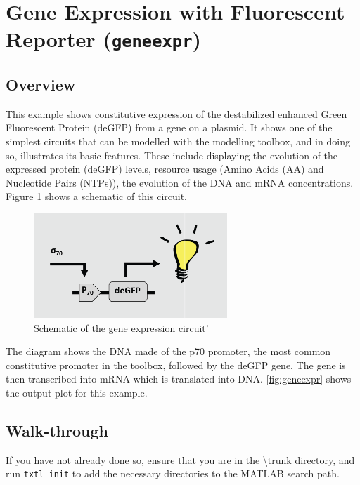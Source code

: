\documentclass[english]{report}
\begin{document}
	\section{Gene Expression with Fluorescent Reporter (\texttt{geneexpr})}
		\subsection{Overview}
		This example shows constitutive expression of the destabilized enhanced Green Fluorescent Protein (deGFP) from a gene on a plasmid. It shows one of the simplest circuits that can be modelled with the modelling toolbox, and in doing so, illustrates its basic features. These include displaying the evolution of the expressed protein (deGFP) levels, resource usage (Amino Acids (AA) and Nucleotide Pairs (NTPs)), the evolution of the DNA and mRNA concentrations. Figure \ref{fig:geneexpr schematic} shows a schematic of this circuit. \\
		
		\begin{figure}
		\begin{center}
		\includegraphics{geneExpr schematic.png} 
		\caption{Schematic of the gene expression circuit'}
		\label{fig:geneexpr schematic}
		\end{center}
		\end{figure}		
		 
		The diagram shows the DNA made of the p70 promoter, the most common constitutive promoter in the toolbox, followed by the deGFP gene. The gene is then transcribed into mRNA which is translated into DNA. 
		\ref{fig:geneexpr} shows the output plot for this example. 
		
		
		
		\subsection{Walk-through}
		If you have not already done so, ensure that you are in the \textsf{\textbackslash trunk} directory, and run \texttt{txtl\_init} to add the necessary directories to the MATLAB search path. 
			
\end{document}
